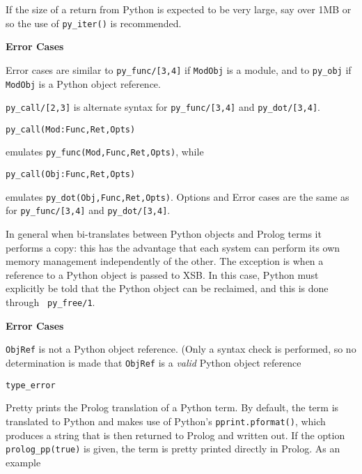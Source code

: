 \begin{description}
If the size of a return from Python is expected to be very large, say
over 1MB or so the use of {\tt py\_iter()} is recommended.

{\bf Error Cases}

Error cases are similar to {\tt py\_func/[3,4]} if {\tt ModObj} is a
module, and to {\tt py\_obj} if {\tt ModObj} is a Python object
reference.


%
{\tt py\_call/[2,3]} is alternate syntax for {\tt py\_func/[3,4]} and
{\tt py\_dot/[3,4]}.

{\tt py\_call(Mod:Func,Ret,Opts)}

\noindent
emulates {\tt py\_func(Mod,Func,Ret,Opts)}, while

{\tt py\_call(Obj:Func,Ret,Opts)}

\noindent
emulates {\tt py\_dot(Obj,Func,Ret,Opts)}.  Options and Error cases
are the same as for {\tt py\_func/[3,4]} and {\tt py\_dot/[3,4]}.

%
  In general when \janus{} bi-translates between Python objects and
  Prolog terms it performs a copy: this has the advantage that each
  system can perform its own memory management independently of the
  other.  The exception is when a reference to a Python object is
  passed to XSB.  In this case, Python must explicitly be told that
  the Python object can be reclaimed, and this is done through {\tt
    py\_free/1}.

  {\bf Error Cases}

  \bi
\item {\tt ObjRef} is not a Python object reference.  (Only a syntax
  check is performed, so no determination is made that {\tt ObjRef} is
  a {\em valid} Python object reference
  \bi
  \item {\tt type\_error}
  \ei
  \ei
  
%
Pretty prints the Prolog translation of a \janus{} Python term.  By
default, the term is translated to Python and makes use of Python's
{\tt pprint.pformat()}, which produces a string that is then returned
to Prolog and written out.  If the option {\tt prolog\_pp(true)} is
given, the term is pretty printed directly in Prolog.  As an example


\end{description}
